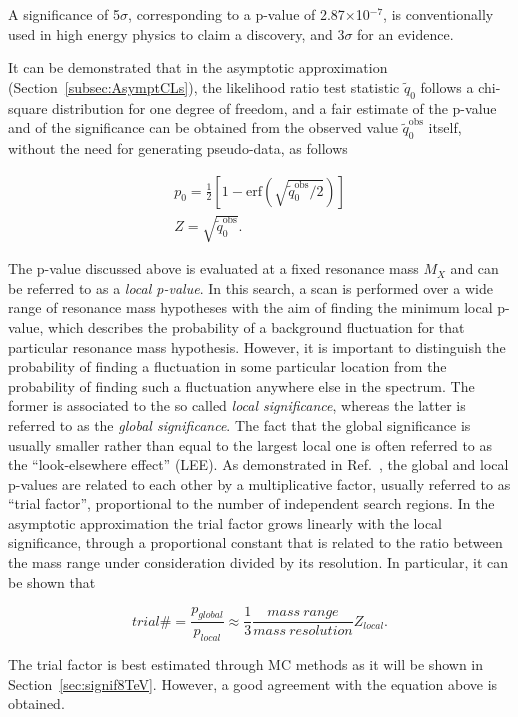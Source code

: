 A significance of 5$\sigma$, corresponding to a p-value of 2.87$\times$10$^{-7}$, is conventionally used in high energy physics to claim a discovery,
and 3$\sigma$ for an evidence.

It can be demonstrated that in the asymptotic approximation (Section~\ref{subsec:AsymptCLs}), the likelihood ratio test statistic $\tilde{q}_0$
follows a chi-square distribution for one degree of freedom, and a fair estimate of the p-value and of the significance can be obtained from the observed value $\tilde{q}_0^\mathrm{obs}$ itself,
without the need for generating pseudo-data, as follows

\begin{equation}
\begin{gathered}
p_0 = \frac{1}{2} [ 1 - \mathrm{erf}(\sqrt{\tilde{q}_0^\mathrm{obs}/2}) ] \\
Z = \sqrt{\tilde{q}_0^\mathrm{obs}}.
\end{gathered}
\end{equation}

The p-value discussed above is evaluated at a fixed resonance mass $M_X$ and can be referred to as a \textit{local p-value}.
In this search, a scan is performed over a wide range of resonance mass hypotheses with the aim of finding
the minimum local p-value, which describes the probability of a background fluctuation for that particular resonance mass hypothesis.
However, it is important to distinguish the probability of finding a fluctuation in some particular location from the probability of finding such a fluctuation anywhere else in the spectrum.
The former is associated to the so called \textit{local significance}, whereas the latter is referred to as the \textit{global significance}.
The fact that the global significance is usually smaller rather than equal to the largest local one is often referred to as the ``look-elsewhere effect'' (LEE).
As demonstrated in Ref.~\cite{Gross:2010qma}, the global and local p-values are related to each other by a multiplicative factor, usually referred to as ``trial factor'', proportional to the number of independent search regions.
In the asymptotic approximation the trial factor grows linearly with the local significance, through a proportional constant
that is related to the ratio between the mass range under consideration divided by its resolution. In particular, it can be shown that

\begin{equation}\label{eqn:trials}
trial\# = \frac{p_{global}}{p_{local}} \approx \frac{1}{3}\frac{mass\ range}{mass\ resolution}Z_{local}.
\end{equation}

The trial factor is best estimated through MC methods as it will be shown in Section~\ref{sec:signif8TeV}. However, a good agreement with the equation above is obtained.